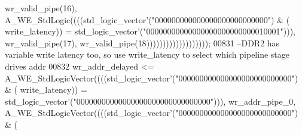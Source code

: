 \begin{DoxyCode}
{      wr_valid_pipe}\textcolor{vhdlchar}{(}\textcolor{vhdllogic}{}\textcolor{vhdllogic}{16}\textcolor{vhdlchar}{)}\textcolor{vhdlchar}{,} \textcolor{vhdlchar}{A\_WE\_StdLogic}\textcolor{vhdlchar}{(}\textcolor{vhdlchar}{(}\textcolor{vhdlchar}{(}\textcolor{vhdlchar}{(}\textcolor{comment}{std\_logic\_vector}\textcolor{vhdlchar}{'}\textcolor{vhdlchar}{(}\textcolor{vhdllogic}{"000000000000000000000000000"}\textcolor{vhdlchar}{)} \textcolor{vhdlchar}{&} \textcolor{vhdlchar}{(}\textcolor{vhdlchar}{
      write_latency}\textcolor{vhdlchar}{)}\textcolor{vhdlchar}{)} \textcolor{vhdlchar}{=} \textcolor{comment}{std\_logic\_vector}\textcolor{vhdlchar}{'}\textcolor{vhdlchar}{(}\textcolor{vhdllogic}{"00000000000000000000000000010001"}\textcolor{vhdlchar}{)}\textcolor{vhdlchar}{)}\textcolor{vhdlchar}{)}\textcolor{vhdlchar}{,} \textcolor{vhdlchar}{
      wr_valid_pipe}\textcolor{vhdlchar}{(}\textcolor{vhdllogic}{}\textcolor{vhdllogic}{17}\textcolor{vhdlchar}{)}\textcolor{vhdlchar}{,} \textcolor{vhdlchar}{wr_valid_pipe}\textcolor{vhdlchar}{(}\textcolor{vhdllogic}{}\textcolor{vhdllogic}{18}\textcolor{vhdlchar}{)}\textcolor{vhdlchar}{)}\textcolor{vhdlchar}{)}\textcolor{vhdlchar}{)}\textcolor{vhdlchar}{)}\textcolor{vhdlchar}{)}\textcolor{vhdlchar}{)}\textcolor{vhdlchar}{)}\textcolor{vhdlchar}{)}\textcolor{vhdlchar}{)}\textcolor{vhdlchar}{)}\textcolor{vhdlchar}{)}\textcolor{vhdlchar}{)}\textcolor{vhdlchar}{)}\textcolor{vhdlchar}{)}\textcolor{vhdlchar}{)}\textcolor{vhdlchar}{)}\textcolor{vhdlchar}{)}\textcolor{vhdlchar}{)};
00831 \textcolor{keyword}{  --DDR2 has variable write latency too, so use write\_latency to select which pipeline stage drives addr}
00832   \textcolor{vhdlchar}{wr_addr_delayed} \textcolor{vhdlchar}{<=} \textcolor{vhdlchar}{A\_WE\_StdLogicVector}\textcolor{vhdlchar}{(}\textcolor{vhdlchar}{(}\textcolor{vhdlchar}{(}\textcolor{vhdlchar}{(}\textcolor{comment}{std\_logic\_vector}\textcolor{vhdlchar}{'}\textcolor{vhdlchar}{(}\textcolor{vhdllogic}{"000000000000000000000000000"}\textcolor{vhdlchar}{)} \textcolor{vhdlchar}{&} \textcolor{vhdlchar}{(}\textcolor{vhdlchar}{
      write_latency}\textcolor{vhdlchar}{)}\textcolor{vhdlchar}{)} \textcolor{vhdlchar}{=} \textcolor{comment}{std\_logic\_vector}\textcolor{vhdlchar}{'}\textcolor{vhdlchar}{(}\textcolor{vhdllogic}{"00000000000000000000000000000000"}\textcolor{vhdlchar}{)}\textcolor{vhdlchar}{)}\textcolor{vhdlchar}{)}\textcolor{vhdlchar}{,} \textcolor{vhdlchar}{
      wr_addr_pipe_0}\textcolor{vhdlchar}{,} \textcolor{vhdlchar}{A\_WE\_StdLogicVector}\textcolor{vhdlchar}{(}\textcolor{vhdlchar}{(}\textcolor{vhdlchar}{(}\textcolor{vhdlchar}{(}\textcolor{comment}{std\_logic\_vector}\textcolor{vhdlchar}{'}\textcolor{vhdlchar}{(}\textcolor{vhdllogic}{"000000000000000000000000000"}\textcolor{vhdlchar}{)} \textcolor{vhdlchar}{&} \textcolor{vhdlchar}{(}\textcolor{vhdlchar}{
}
\end{DoxyCode}
